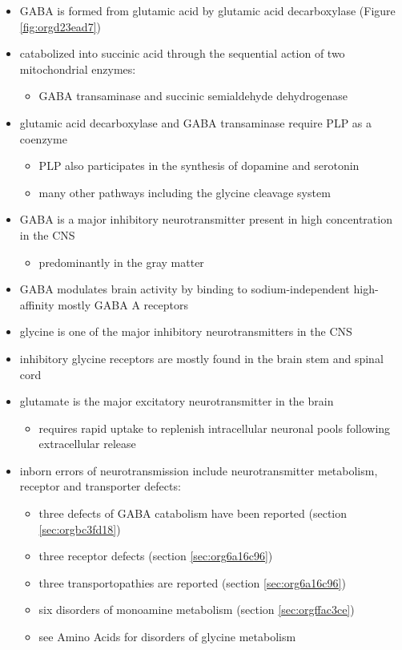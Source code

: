 \documentclass[12pt]{scrartcl}
\begin{document}
\begin{itemize}
\item GABA is formed from glutamic acid by glutamic acid decarboxylase
(Figure \ref{fig:orgd23ead7})
\item catabolized into succinic acid through the sequential action of two
mitochondrial enzymes:
\begin{itemize}
\item GABA transaminase and succinic semialdehyde dehydrogenase
\end{itemize}
\item glutamic acid decarboxylase and GABA transaminase require PLP as a coenzyme
\begin{itemize}
\item PLP also participates in the synthesis of dopamine and serotonin
\item many other pathways including the glycine cleavage system
\end{itemize}
\item GABA is a major inhibitory neurotransmitter present in high
concentration in the CNS
\begin{itemize}
\item predominantly in the gray matter
\end{itemize}
\item GABA modulates brain activity by binding to
sodium-independent high-affinity  mostly GABA A receptors
\item glycine is one of the major inhibitory neurotransmitters in the CNS
\item inhibitory glycine receptors are mostly found in the brain stem
and spinal cord
\item glutamate is the major excitatory neurotransmitter in the brain
\begin{itemize}
\item requires rapid uptake to replenish intracellular
neuronal pools following extracellular release
\end{itemize}
\item inborn errors of neurotransmission include neurotransmitter
metabolism, receptor and transporter defects:
\begin{itemize}
\item three defects of GABA catabolism have been reported (section \ref{sec:orgbc3fd18})
\item three receptor defects (section \ref{sec:org6a16c96})
\item three transportopathies are reported (section \ref{sec:org6a16c96})
\item six disorders of monoamine metabolism (section \ref{sec:orgffac3ce})
\item see Amino Acids for disorders of glycine metabolism
\end{itemize}
\end{itemize}
\end{document}
